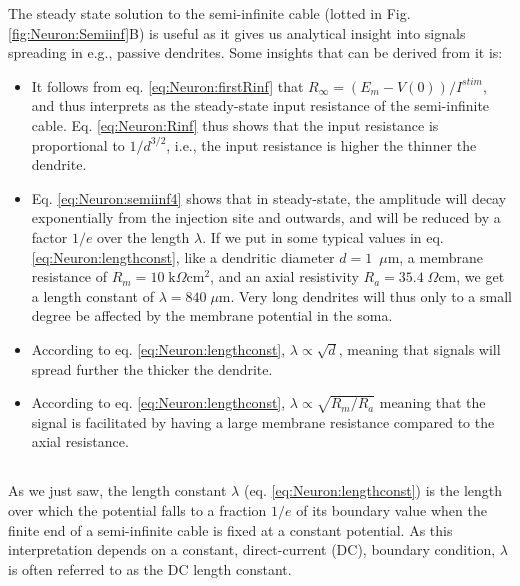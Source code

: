 The steady state solution to the semi-infinite cable (lotted in Fig. \ref{fig:Neuron:Semiinf}B) is useful as it gives us analytical insight into signals spreading in e.g., passive dendrites. Some insights that can be derived from it is:

\begin{itemize}

\item It follows from eq. \ref{eq:Neuron:firstRinf} that $R_{\infty} = (E_m-V(0))/I^{stim}$, and thus interprets as the steady-state input resistance of the semi-infinite cable. Eq. \ref{eq:Neuron:Rinf} thus shows that the input resistance is proportional to $1/d^{3/2}$, i.e., the input resistance is higher the thinner the dendrite. 

\item Eq. \ref{eq:Neuron:semiinf4} shows that in steady-state, the amplitude will decay exponentially from the injection site and outwards, and will be reduced by a factor $1/e$ over the length $\lambda$. If we put in some typical values in eq. \ref{eq:Neuron:lengthconst}, like a dendritic diameter $d=1$~$\mu$m, a membrane resistance of $R_m=10\;\text{k}\Omega\text{cm}^2$, and an axial resistivity $R_a=35.4\;\Omega\text{cm}$, we get a length constant of $\lambda = 840\; \mu$m. Very long dendrites will thus only to a small degree be affected by the membrane potential in the soma.

\item According to eq. \ref{eq:Neuron:lengthconst}, $\lambda \propto \sqrt{d}$, meaning that signals will spread further the thicker the dendrite.

\item According to eq. \ref{eq:Neuron:lengthconst}, $\lambda \propto \sqrt{R_m/R_a}$ meaning that the signal is facilitated by having a large membrane resistance compared to the axial resistance. 

\end{itemize}

\subsection{}
\label{sec:Neuron:cablefreq}
As we just saw, the length constant $\lambda$ (eq. \ref{eq:Neuron:lengthconst}) is the length over which the potential falls to a fraction $1/e$ of its boundary value when the finite end of a semi-infinite cable is fixed at a constant potential. As this interpretation depends on a constant, direct-current (DC), boundary condition, $\lambda$ is often referred to as the DC length constant. 

